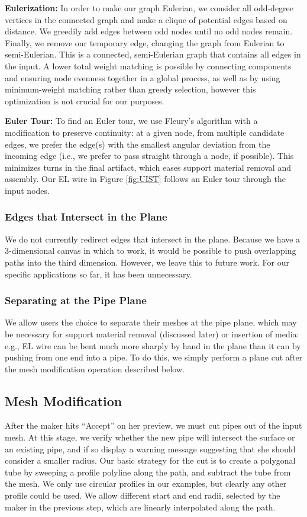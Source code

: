 {\bf Eulerization:} In order to make our graph Eulerian, we consider all odd-degree vertices in the connected graph and make a clique of potential edges based on distance.  We greedily add edges between odd nodes until no odd nodes remain.  Finally, we remove our temporary edge, changing the graph from Eulerian to semi-Eulerian.  This is a connected, semi-Eulerian graph that contains all edges in the input.
A lower total weight matching is possible by connecting components and ensuring node evenness together in a global process, as well as by using minimum-weight matching rather than greedy selection, however this optimization is not crucial for our purposes.

{\bf Euler Tour:} To find an Euler tour, we use Fleury's algorithm \cite{Fleury} with a modification to preserve continuity: at a given node, from multiple candidate edges, we prefer the edge(s) with the smallest angular deviation from the incoming edge (i.e., we prefer to pass straight through a node, if possible).  This minimizes turns in the final artifact, which eases support material removal and assembly.  Our EL wire in Figure \ref{fig:UIST} follows an Euler tour through the input nodes.

\subsubsection{Edges that Intersect in the Plane}
We do not currently redirect edges that intersect in the plane.  Because we have a 3-dimensional canvas in which to work, it would be possible to push overlapping paths into the third dimension.  However, we leave this to future work.  For our specific applications so far, it has been unnecessary.

\subsubsection{Separating at the Pipe Plane}
We allow users the choice to separate their meshes at the pipe plane, which may be necessary for support material removal (discussed later) or insertion of media: e.g., EL wire can be bent much more sharply by hand in the plane than it can by pushing from one end into a pipe.  To do this, we simply perform a plane cut after the mesh modification operation described below.

\subsection{Mesh Modification}
After the maker hits ``Accept'' on her preview, we must cut pipes out of the input mesh.  At this stage, we verify whether the new pipe will intersect the surface or an existing pipe, and if so display a warning message suggesting that she should consider a smaller radius.
Our basic strategy for the cut is to create a polygonal tube by sweeping a profile polyline
along the path, and subtract the tube from the mesh. We only use circular profiles
in our examples, but clearly any other profile could be used. 
We allow different start and end radii, selected by the maker in the previous step, which are linearly interpolated along the path.

